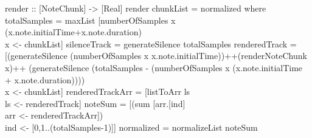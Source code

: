 \documentclass[a0,portrait]{a0poster}
\begin{document}
\begin{sectbox}
\begin{CleanCode}
render :: [NoteChunk] -> [Real]
render chunkList = normalized
where
	totalSamples = maxList [numberOfSamples x (x.note.initialTime+x.note.duration) \\x <- chunkList]
	silenceTrack = generateSilence totalSamples
	renderedTrack = [(generateSilence (numberOfSamples x x.note.initialTime))++(renderNoteChunk x)++                 
	                 (generateSilence (totalSamples - (numberOfSamples x (x.note.initialTime +
	                 x.note.duration)))) \\ x <- chunkList]
	renderedTrackArr = [listToArr ls \\ ls <- renderedTrack]
	noteSum = [(sum [arr.[ind] \\ arr <- renderedTrackArr]) \\ ind <- [0,1..(totalSamples-1)]]
	normalized = normalizeList noteSum
\end{CleanCode}

\end{sectbox}
\hspace{0.03\textwidth}
%
\end{document}
